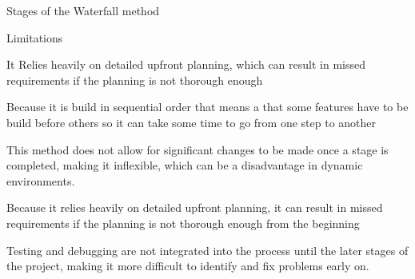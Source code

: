 \begin{frame}{Stages of the Waterfall method}
    \begin{block}{Limitations}
        \item It Relies heavily on detailed upfront planning, which can result in missed requirements if the planning is not thorough enough
        \item Because it is build in sequential order that means a that some features have to be build before others so it can take some time to go from one step to another
        \item This method does not allow for significant changes to be made once a stage is completed, making it inflexible, which can be a disadvantage in dynamic environments.
        \item Because it relies heavily on detailed upfront planning, it can result in missed requirements if the planning is not thorough enough from the beginning 
        \item Testing and debugging are not integrated into the process until the later stages of the project, making it more difficult to identify and fix problems early on.
        
    \end{block}
    
    \end{frame}